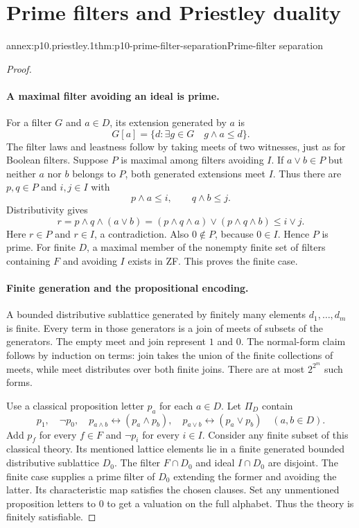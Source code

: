 
\section{Prime filters and Priestley duality}

\begin{annexitem}{annex:p10.priestley.1}{thm:p10-prime-filter-separation}{Prime-filter separation}
\begin{proof}
\paragraph{A maximal filter avoiding an ideal is prime.}
For a filter \(G\) and \(a\in D\), its extension generated by \(a\) is
\[
 G[a]=\{d:\exists g\in G\quad g\wedge a\leq d\}.
\]
The filter laws and leastness follow by taking meets of two
witnesses, just as for Boolean filters.
Suppose \(P\) is maximal among filters avoiding \(I\).
If \(a\vee b\in P\) but neither \(a\) nor \(b\) belongs to \(P\),
both generated extensions meet \(I\).
Thus there are \(p,q\in P\) and \(i,j\in I\) with
\[
 p\wedge a\leq i,\qquad q\wedge b\leq j.
\]
Distributivity gives
\[
 r=p\wedge q\wedge(a\vee b)
   =(p\wedge q\wedge a)\vee(p\wedge q\wedge b)
   \leq i\vee j.
\]
Here \(r\in P\) and \(r\in I\), a contradiction.
Also \(0\notin P\), because \(0\in I\).
Hence \(P\) is prime.
For finite \(D\), a maximal member of the nonempty finite set
of filters containing \(F\) and avoiding \(I\) exists in ZF.
This proves the finite case.

\paragraph{Finite generation and the propositional encoding.}
A bounded distributive sublattice generated by finitely many
elements \(d_1,\ldots,d_m\) is finite.
Every term in those generators is a join of meets of subsets
of the generators.
The empty meet and join represent \(1\) and \(0\).
The normal-form claim follows by induction on terms: join takes
the union of the finite collections of meets, while meet
distributes over both finite joins.
There are at most \(2^{2^m}\) such forms.

Use a classical proposition letter \(p_a\) for each \(a\in D\).
Let \(\Pi_D\) contain
\[
 p_1,\quad\neg p_0,\quad
 p_{a\wedge b}\leftrightarrow(p_a\wedge p_b),\quad
 p_{a\vee b}\leftrightarrow(p_a\vee p_b)
       \quad(a,b\in D).
\]
Add \(p_f\) for every \(f\in F\) and \(\neg p_i\) for every \(i\in I\).
Consider any finite subset of this classical theory.
Its mentioned lattice elements lie in a finite generated bounded
distributive sublattice \(D_0\).
The filter \(F\cap D_0\) and ideal \(I\cap D_0\) are disjoint.
The finite case supplies a prime filter of \(D_0\) extending the
former and avoiding the latter.
Its characteristic map satisfies the chosen clauses.
Set any unmentioned proposition letters to \(0\) to get a
valuation on the full alphabet.
Thus the theory is finitely satisfiable.


\end{proof}
\end{annexitem}
